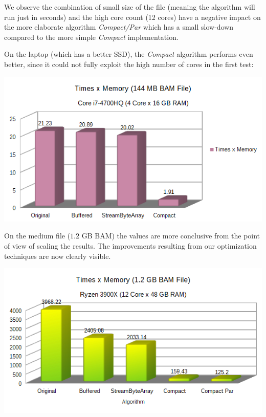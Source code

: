 \documentclass[a4paper,twoside]{article}
\begin{document}
We observe the combination of small size of the file (meaning the algorithm will run just in seconds) and the high core count (12 cores) have a negative impact on the more elaborate algorithm {\it Compact/Par} which has a small slow-down compared to the more simple {\it Compact} implementation.

On the laptop (which has a better SSD), the {\it Compact} algorithm performs even better, since it could not fully exploit the high number of cores in the first test:

\begin{center}
	\includegraphics[scale=0.5]{images/times_and_memory_chart_small_144mb_intel.png}
\end{center}


On the medium file ($1.2$ GB BAM) the values are more conclusive from the point of view of scaling the results. The improvements resulting from our optimization techniques are now clearly visible.

\begin{center}
	\includegraphics[scale=0.5]{images/times_and_memory_chart.png}
\end{center}
\end{document}
